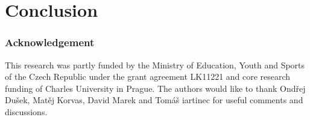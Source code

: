 \chapter{Conclusion}
\label{cha:conclusion}


\subsection*{Acknowledgement}
\label{sub:acknowledgement}
This research was partly funded by the Ministry of Education, Youth and Sports
of the Czech Republic under the grant agreement LK11221 and core research
funding of Charles University in Prague. The authors would like to thank
Ondřej Dušek, Matěj Korvas, David Marek and Tomáš iartinec for useful comments and discussions.  

